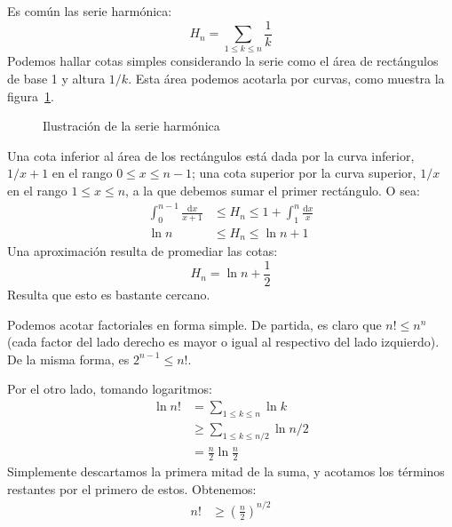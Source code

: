   Es común las serie harmónica:
  \begin{equation*}
    H_n
      = \sum_{ 1 \le k \le n} \frac{1}{k}
  \end{equation*}
  Podemos hallar cotas simples
  considerando la serie como el área de rectángulos de base \num{1}
  y altura \(1 / k\).
  Esta área podemos acotarla por curvas,
  como muestra la figura~\ref{fig:harmonic-areas}.
  \begin{figure}[ht]
    \centering
    \caption{Ilustración de la serie harmónica}
    \label{fig:harmonic-areas}
  \end{figure}
  Una cota inferior al área de los rectángulos
  está dada por la curva inferior,
  \(1 / x + 1\)
  en el rango \(0 \le x \le n - 1\);
  una cota superior por la curva superior,
  \(1 / x\) en el rango \(1 \le x \le n\),
  a la que debemos sumar el primer rectángulo.
  O sea:
  \begin{align*}
    \int_0^{n - 1} \frac{\mathrm{d} x}{x + 1}
      &\le H_n
       \le 1 + \int_1^n \frac{\mathrm{d} x}{x} \\
    \ln n
      &\le H_n
       \le \ln n + 1
  \end{align*}
  Una aproximación resulta de promediar las cotas:
  \begin{equation*}
    H_n
      = \ln n + \frac{1}{2}
  \end{equation*}
  Resulta que esto es bastante cercano.

  Podemos acotar factoriales en forma simple.
  De partida,
  es claro que \(n! \le n^n\)
  (cada factor del lado derecho
   es mayor o igual al respectivo del lado izquierdo).
  De la misma forma,
  es \(2^{n - 1} \le n!\).

  Por el otro lado,
  tomando logaritmos:
  \begin{align*}
    \ln n!
      &=    \sum_{1 \le k \le n} \ln k \\
      &\ge  \sum_{1 \le k \le n / 2} \ln n / 2 \\
      &=    \frac{n}{2} \ln \frac{n}{2}
  \end{align*}
  Simplemente descartamos la primera mitad de la suma,
  y acotamos los términos restantes por el primero de estos.
  Obtenemos:
  \begin{align*}
    n!
      &\ge \left( \frac{n}{2} \right)^{n / 2}
  \end{align*}

